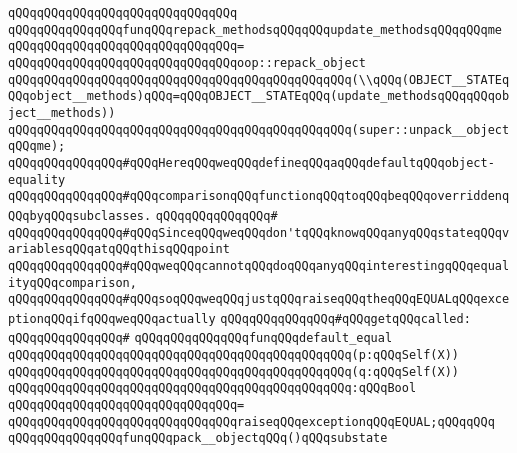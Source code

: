\verb|qQQqqQQqqQQqqQQqqQQqqQQqqQQqqQQq|\newline
\verb|qQQqqQQqqQQqqQQqfunqQQqrepack_methodsqQQqqQQqupdate_methodsqQQqqQQqme|\newline
\verb|qQQqqQQqqQQqqQQqqQQqqQQqqQQqqQQq=|\newline
\verb|qQQqqQQqqQQqqQQqqQQqqQQqqQQqqQQqoop::repack_object|\newline
\verb|qQQqqQQqqQQqqQQqqQQqqQQqqQQqqQQqqQQqqQQqqQQqqQQq(\\qQQq(OBJECT__STATEqQQqobject__methods)qQQq=qQQqOBJECT__STATEqQQq(update_methodsqQQqqQQqobject__methods))|\newline
\verb|qQQqqQQqqQQqqQQqqQQqqQQqqQQqqQQqqQQqqQQqqQQqqQQq(super::unpack__objectqQQqme);|\newline
\newline
\verb|qQQqqQQqqQQqqQQq#qQQqHereqQQqweqQQqdefineqQQqaqQQqdefaultqQQqobject-equality|\newline
\verb|qQQqqQQqqQQqqQQq#qQQqcomparisonqQQqfunctionqQQqtoqQQqbeqQQqoverriddenqQQqbyqQQqsubclasses.|\newline
\verb|qQQqqQQqqQQqqQQq#|\newline
\verb|qQQqqQQqqQQqqQQq#qQQqSinceqQQqweqQQqdon'tqQQqknowqQQqanyqQQqstateqQQqvariablesqQQqatqQQqthisqQQqpoint|\newline
\verb|qQQqqQQqqQQqqQQq#qQQqweqQQqcannotqQQqdoqQQqanyqQQqinterestingqQQqequalityqQQqcomparison,|\newline
\verb|qQQqqQQqqQQqqQQq#qQQqsoqQQqweqQQqjustqQQqraiseqQQqtheqQQqEQUALqQQqexceptionqQQqifqQQqweqQQqactually|\newline
\verb|qQQqqQQqqQQqqQQq#qQQqgetqQQqcalled:|\newline
\verb|qQQqqQQqqQQqqQQq#|\newline
\verb|qQQqqQQqqQQqqQQqfunqQQqdefault_equal|\newline
\verb|qQQqqQQqqQQqqQQqqQQqqQQqqQQqqQQqqQQqqQQqqQQqqQQq(p:qQQqSelf(X))|\newline
\verb|qQQqqQQqqQQqqQQqqQQqqQQqqQQqqQQqqQQqqQQqqQQqqQQq(q:qQQqSelf(X))|\newline
\verb|qQQqqQQqqQQqqQQqqQQqqQQqqQQqqQQqqQQqqQQqqQQqqQQq:qQQqBool|\newline
\verb|qQQqqQQqqQQqqQQqqQQqqQQqqQQqqQQq=|\newline
\verb|qQQqqQQqqQQqqQQqqQQqqQQqqQQqqQQqraiseqQQqexceptionqQQqEQUAL;qQQqqQQq|\newline
\newline
\verb|qQQqqQQqqQQqqQQqfunqQQqpack__objectqQQq()qQQqsubstate|\newline
